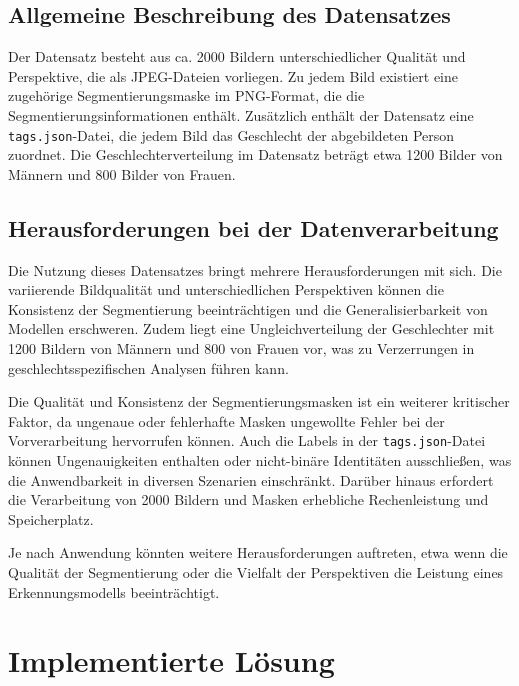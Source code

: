 \documentclass[journal,twoside,web]{ieeecolor}
\begin{document}
\subsection{Allgemeine Beschreibung des Datensatzes}
\label{sec:dataset_description}
Der Datensatz besteht aus ca. 2000 Bildern unterschiedlicher Qualität und Perspektive, die als JPEG-Dateien vorliegen. Zu jedem Bild existiert eine zugehörige Segmentierungsmaske im PNG-Format, die die Segmentierungsinformationen enthält. Zusätzlich enthält der Datensatz eine \texttt{tags.json}-Datei, die jedem Bild das Geschlecht der abgebildeten Person zuordnet. Die Geschlechterverteilung im Datensatz beträgt etwa 1200 Bilder von Männern und 800 Bilder von Frauen.

\subsection{Herausforderungen bei der Datenverarbeitung}  
Die Nutzung dieses Datensatzes bringt mehrere Herausforderungen mit sich. Die variierende Bildqualität und unterschiedlichen Perspektiven können die Konsistenz der Segmentierung beeinträchtigen und die Generalisierbarkeit von Modellen erschweren. Zudem liegt eine Ungleichverteilung der Geschlechter mit 1200 Bildern von Männern und 800 von Frauen vor, was zu Verzerrungen in geschlechtsspezifischen Analysen führen kann. 

Die Qualität und Konsistenz der Segmentierungsmasken ist ein weiterer kritischer Faktor, da ungenaue oder fehlerhafte Masken ungewollte Fehler bei der Vorverarbeitung hervorrufen können. Auch die Labels in der \texttt{tags.json}-Datei können Ungenauigkeiten enthalten oder nicht-binäre Identitäten ausschließen, was die Anwendbarkeit in diversen Szenarien einschränkt. Darüber hinaus erfordert die Verarbeitung von 2000 Bildern und Masken erhebliche Rechenleistung und Speicherplatz. 

Je nach Anwendung könnten weitere Herausforderungen auftreten, etwa wenn die Qualität der Segmentierung oder die Vielfalt der Perspektiven die Leistung eines Erkennungsmodells beeinträchtigt.

\section{Implementierte Lösung}
\end{document}

